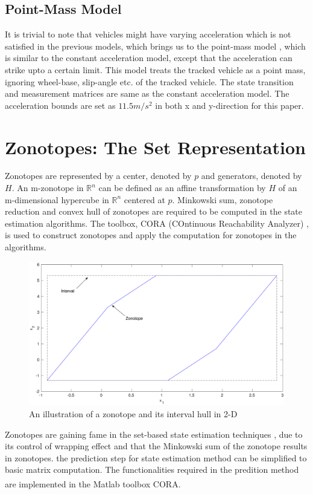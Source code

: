 \subsection{Point-Mass Model}
It is trivial to note that vehicles might have varying acceleration which is not satisfied in the previous models, which brings us to the point-mass model \cite{Althoff}, which is similar to the constant acceleration model, except that the acceleration can strike upto a certain limit. This model treats the tracked vehicle as a point mass, ignoring wheel-base, slip-angle etc. of the tracked vehicle. The state transition and measurement matrices are same as the constant acceleration model. The acceleration bounds are set as $11.5 m/s^2$ in both x and y-direction for this paper.

\section{Zonotopes: The Set Representation}
Zonotopes are represented by a center, denoted by $p$ and generators, denoted by $H$. An m-zonotope in $\mathbb{R}^n$ can be defined as an affine transformation by $H$ of an m-dimensional hypercube in $\mathbb{R}^n$ centered at $p$. Minkowski sum, zonotope reduction and convex hull of zonotopes are required to be computed in the state estimation algorithms. The toolbox, CORA (COntinuous Reachability Analyzer) \cite{Althoff2018}, is used to construct zonotopes and apply the computation for zonotopes in the algorithms. 
\begin{figure}[!h]
\label{fig:zonotope}
\includegraphics[scale=.25]{figures/zonotope}
\caption{An illustration of a zonotope and its interval hull in 2-D}
\end{figure}

Zonotopes are gaining fame in the set-based state estimation techniques \cite{Le2013}, due to its control of wrapping effect and that the Minkowski sum of the zonotope results in zonotopes. the prediction step for state estimation method can be simplified to basic matrix computation. The functionalities required in the predition method are implemented in the Matlab\textsuperscript{\tiny\textregistered} toolbox CORA.

